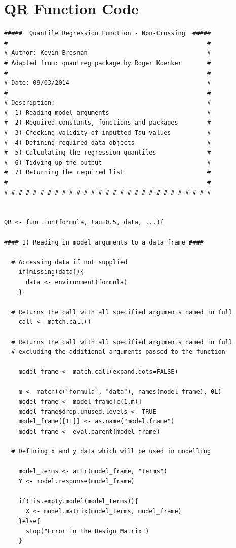 \documentclass[12pt,a4paper]{report}
\begin{document}
\section{QR Function Code}\label{App:QRFunction}
\begin{lstlisting}
#####  Quantile Regression Function - Non-Crossing  #####
#                                                       #
# Author: Kevin Brosnan                                 #
# Adapted from: quantreg package by Roger Koenker       #
#                                                       #
# Date: 09/03/2014                                      #
#                                                       #
# Description:                                          #
#  1) Reading model arguments                           #
#  2) Required constants, functions and packages        #
#  3) Checking validity of inputted Tau values          #
#  4) Defining required data objects                    #
#  5) Calculating the regression quantiles              #
#  6) Tidying up the output                             #
#  7) Returning the required list                       #
#                                                       #
# # # # # # # # # # # # # # # # # # # # # # # # # # # # #


QR <- function(formula, tau=0.5, data, ...){

#### 1) Reading in model arguments to a data frame ####

  # Accessing data if not supplied
    if(missing(data)){
      data <- environment(formula)
    }

  # Returns the call with all specified arguments named in full
    call <- match.call()

  # Returns the call with all specified arguments named in full
  # excluding the additional arguments passed to the function

    model_frame <- match.call(expand.dots=FALSE)

    m <- match(c("formula", "data"), names(model_frame), 0L)
    model_frame <- model_frame[c(1,m)]
    model_frame$drop.unused.levels <- TRUE
    model_frame[[1L]] <- as.name("model.frame")
    model_frame <- eval.parent(model_frame)

  # Defining x and y data which will be used in modelling

    model_terms <- attr(model_frame, "terms")
    Y <- model.response(model_frame)

    if(!is.empty.model(model_terms)){
      X <- model.matrix(model_terms, model_frame)
    }else{
      stop("Error in the Design Matrix")
    }


\end{lstlisting}
\end{document}

